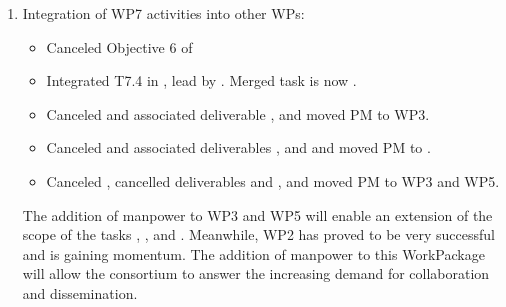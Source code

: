 \begin{enumerate}
\item Integration of WP7 activities into other WPs:
  \begin{itemize}
 \item Canceled Objective 6 of \TheProject 
 \item Integrated T7.4 in
    , lead by
    . Merged task is now
    .
  \item Canceled  and associated deliverable , and moved PM to WP3.
  \item Canceled  and associated deliverables  ,  and  and moved PM to .
  \item Canceled , cancelled deliverables  and , and moved PM to WP3 and WP5.
  \end{itemize}
  The addition of manpower to WP3 and WP5 will enable an extension of
  the scope of the tasks
  ,
  , and
  .
  Meanwhile, WP2 has proved to be very successful and \TheProject is
  gaining momentum. The addition of manpower to this WorkPackage will
  allow the consortium to answer the increasing demand for
  collaboration and dissemination.



\end{enumerate}
